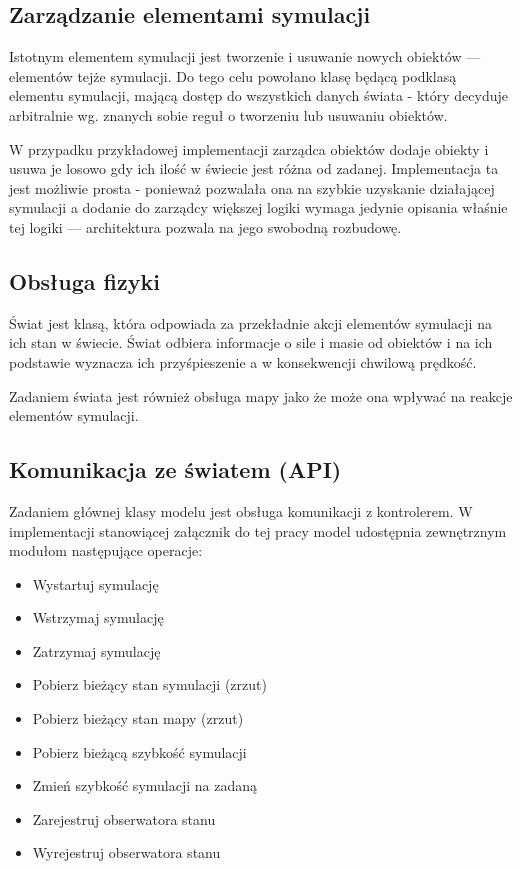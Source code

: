 {{{\subsection{Zarządzanie elementami symulacji}
\par{
Istotnym elementem symulacji jest tworzenie i usuwanie nowych obiektów --- elementów tejże symulacji. Do tego celu powołano klasę będącą podklasą elementu symulacji, mającą dostęp do wszystkich danych świata - który decyduje arbitralnie  wg. znanych sobie reguł o tworzeniu lub usuwaniu obiektów.
}
\par{
W przypadku przykładowej implementacji zarządca obiektów dodaje obiekty i usuwa je losowo gdy ich ilość w świecie jest różna od zadanej. Implementacja ta jest możliwie prosta - ponieważ pozwalała ona na szybkie uzyskanie działającej symulacji a dodanie do zarządcy większej logiki wymaga jedynie opisania właśnie tej logiki --- architektura pozwala na jego swobodną rozbudowę.
}

\subsection{Obsługa fizyki}
\par{
Świat jest klasą, która odpowiada za przekładnie akcji elementów symulacji na ich stan w świecie. Świat odbiera informacje o sile i masie od obiektów i na ich podstawie wyznacza ich przyśpieszenie a w konsekwencji chwilową prędkość.
}
\par{
Zadaniem świata jest również obsługa mapy jako że może ona wpływać na reakcje elementów symulacji.
}

\subsection{Komunikacja ze światem (API)}
\par{
Zadaniem głównej klasy modelu jest obsługa komunikacji z kontrolerem. W implementacji stanowiącej załącznik do tej pracy model udostępnia zewnętrznym modułom następujące operacje:
\begin{itemize}
\item Wystartuj symulację
\item Wstrzymaj symulację
\item Zatrzymaj symulację
\item Pobierz bieżący stan symulacji (zrzut)
\item Pobierz bieżący stan mapy (zrzut)
\item Pobierz bieżącą szybkość symulacji
\item Zmień szybkość symulacji na zadaną
\item Zarejestruj obserwatora stanu
\item Wyrejestruj obserwatora stanu
\end{itemize}
}
}}}

